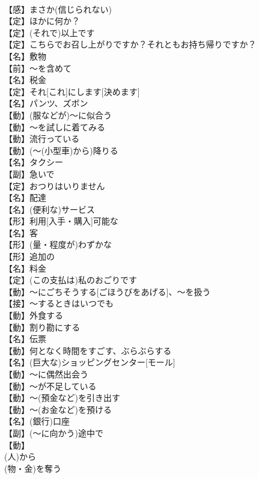 \documentclass[8pt]{extreport}
\begin{document}
\begin{CJK}{UTF8}{min}
\\	【感】まさか(信じられない)
\\	【定】ほかに何か？
\\	【定】(それで)以上です
\\	【定】こちらでお召し上がりですか？それともお持ち帰りですか？
\\	【名】敷物
\\	【前】～を含めて
\\	【名】税金
\\	【定】それ[これ]にします[決めます]
\\	【名】パンツ、ズボン
\\	【動】(服などが)～に似合う
\\	【動】～を試しに着てみる
\\	【動】流行っている
\\	【動】(～(小型車)から)降りる
\\	【名】タクシー
\\	【副】急いで
\\	【定】おつりはいりません
\\	【名】配達
\\	【名】(便利な)サービス
\\	【形】利用[入手・購入]可能な
\\	【名】客
\\	【形】(量・程度が)わずかな
\\	【形】追加の
\\	【名】料金
\\	【定】(この支払は)私のおごりです
\\	【動】～にごちそうする[ごほうびをあげる]、～を扱う
\\	【接】～するときはいつでも
\\	【動】外食する
\\	【動】割り勘にする
\\	【名】伝票
\\	【動】何となく時間をすごす、ぶらぶらする
\\	【名】(巨大な)ショッピングセンター[モール]
\\	【動】～に偶然出会う
\\	【動】～が不足している
\\	【動】～(預金など)を引き出す
\\	【動】～(お金など)を預ける
\\	【名】(銀行)口座
\\	【副】(～に向かう)途中で
\\	【動】
\\	(人)から
\\	(物・金)を奪う

\end{CJK}
\end{document}
